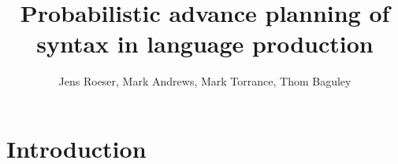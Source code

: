 \documentclass[a4paper,man,natbib,noextraspace]{apa6}
\title{Probabilistic advance planning of syntax in language production }
\author{Jens Roeser, Mark Andrews, Mark Torrance, Thom Baguley} %
\affiliation{Department of Psychology, Nottingham Trent University, Nottingham, UK}
\begin{document}
\maketitle


\section{Introduction}



\end{document}
